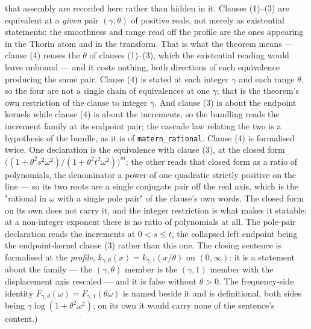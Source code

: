 \begin{theorem}
{that assembly are recorded here rather than hidden in it. Clauses (1)--(3) are equivalent at a
\emph{given} pair $(\gamma,\theta)$ of positive reals, not merely as existential statements: the
smoothness and range read off the profile are the ones appearing in the Thorin atom and in the
transform. That is what the theorem means --- clause (4) reuses the $\theta$ of clauses
(1)--(3), which the existential reading would leave unbound --- and it costs nothing, both
directions of each equivalence producing the same pair. Clause (4) is stated at each integer
$\gamma$ and each range $\theta$, so the four are not a single chain of equivalences at one
$\gamma$; that is the theorem's own restriction of the clause to integer $\gamma$. And clause (3) is about the
endpoint kernels while clause (4) is about the increments, so the bundling reads the increment
family at its endpoint pair; the cascade law relating the two is a hypothesis of the bundle, as it
is of \texttt{matern\_rational}. Clause (4) is formalised twice. One declaration is the
equivalence with clause (3), at the closed form
$\bigl((1+\theta^2s^2\omega^2)/(1+\theta^2t^2\omega^2)\bigr)^{m}$; the other reads that closed
form as a ratio of polynomials, the denominator a power of one quadratic strictly positive on
the line --- so its two roots are a single conjugate pair off the real axis, which is the
"rational in $\omega$ with a single pole pair" of the clause's own words. The closed form on its
own does not carry it, and the integer restriction is what makes it statable: at a non-integer
exponent there is no ratio of polynomials at all. The pole-pair declaration reads the increments
at $0 < s \le t$, the collapsed left endpoint being the endpoint-kernel clause (3) rather than
this one. The closing sentence is formalised at the \emph{profile},
$k_{\gamma,\theta}(x) = k_{\gamma,1}(x/\theta)$ on $(0,\infty)$: it is a statement about the
family --- the $(\gamma,\theta)$ member is the $(\gamma,1)$ member with the displacement axis
rescaled --- and it is false without $\theta > 0$. The frequency-side identity
$F_{\gamma,\theta}(\omega) = F_{\gamma,1}(\theta\omega)$ is named beside it and is definitional,
both sides being $\gamma\log(1+\theta^2\omega^2)$; on its own it would carry none of the
sentence's content.)}
\end{theorem}


